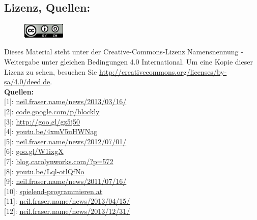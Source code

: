 \subsection*{Lizenz, Quellen:}
\begin{figure}
\includegraphics[width=2cm]{vietnam/ccbysa88x31.png}
\end{figure}
Dieses Material steht unter der Creative-Commons-Lizenz Namensnennung - Weitergabe unter gleichen Bedingungen 4.0 International. Um eine Kopie dieser Lizenz zu sehen, besuchen Sie \url{http://creativecommons.org/licenses/by-sa/4.0/deed.de}. \\

\textbf{Quellen:} \\
{[}1{]}: \href{https://neil.fraser.name/news/2013/03/16/}{neil.fraser.name/news/2013/03/16/} \\
{[}2{]}: \href{https://code.google.com/p/blockly/}{code.google.com/p/blockly} \\
{[}3{]}: \href{https://blockly-demo.appspot.com/static/apps/index.html?lang=de}{http://goo.gl/gz5j50} \\
{[}4{]}: \href{http://www.youtube.com/watch?v=4xmV5uHWNag}{youtu.be/4xmV5uHWNag} \\
{[}5{]}: \href{http://neil.fraser.name/news/2012/07/01/}{neil.fraser.name/news/2012/07/01/} \\
{[}6{]}: \href{http://www.marylandpublicschools.org/MSDE/programs/esea/docs/TQ_Regulations/core_subjects.htm}{goo.gl/W1ixgX} \\
{[}7{]}: \href{http://blog.carolynworks.com/?p=572}{blog.carolynworks.com/?p=572} \\
{[}8{]}: \href{http://youtu.be/Lql-otlQfNo}{youtu.be/Lql-otlQfNo} \\
{[}9{]}: \href{https://neil.fraser.name/news/2011/07/16/}{neil.fraser.name/news/2011/07/16/} \\
{[}10{]}: \href{http://spielend-programmieren.at}{spielend-programmieren.at} \\
{[}11{]}: \href{https://neil.fraser.name/news/2013/04/15/}{neil.fraser.name/news/2013/04/15/} \\
{[}12{]}: \href{https://neil.fraser.name/news/2013/12/31/}{neil.fraser.name/news/2013/12/31/} \\
